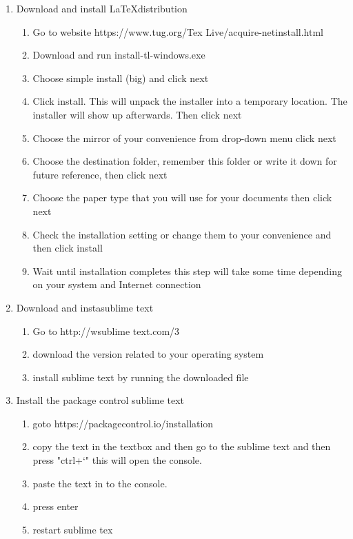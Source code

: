 \documentclass{memoir}
\begin{document}
\begin{enumerate}  
  \item Download and install \LaTeX  distribution
\begin{enumerate}
  \item Go to website https://www.tug.org/Tex Live/acquire-netinstall.html 
  \item Download and run install-tl-windows.exe
  \item Choose simple install (big) and click next
  \item Click install. This will unpack the installer into a temporary location. The installer will show up afterwards. Then click next
  \item Choose the mirror of your convenience from drop-down menu click next
  \item Choose the destination folder, remember this folder or write it down for future reference, then click next
  \item Choose the paper type that you will use for your documents then click next
  \item Check the installation setting or change them to your convenience and then click install
  \item Wait until installation completes this step will take some time depending on your system and Internet connection
\end{enumerate}
\item Download and instasublime text
\begin{enumerate}
  \item Go to http://wsublime text.com/3
  \item download the version related to your operating system
  \item install sublime text by running the downloaded file

\end{enumerate}
  \item Install the package control sublime text
  \begin{enumerate}
    \item goto https://packagecontrol.io/installation
    \item copy the text in the textbox and then go to the sublime text and then press "ctrl+`" this will open the console.
    \item paste the text in to the console.
    \item press enter
    \item restart sublime tex  
  \end{enumerate}
  

\end{enumerate}
\end{document}
